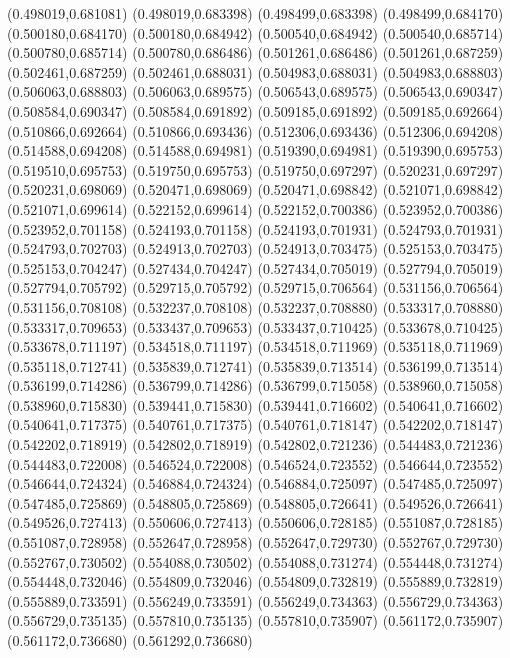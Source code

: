(0.498019,0.681081)
(0.498019,0.683398)
(0.498499,0.683398)
(0.498499,0.684170)
(0.500180,0.684170)
(0.500180,0.684942)
(0.500540,0.684942)
(0.500540,0.685714)
(0.500780,0.685714)
(0.500780,0.686486)
(0.501261,0.686486)
(0.501261,0.687259)
(0.502461,0.687259)
(0.502461,0.688031)
(0.504983,0.688031)
(0.504983,0.688803)
(0.506063,0.688803)
(0.506063,0.689575)
(0.506543,0.689575)
(0.506543,0.690347)
(0.508584,0.690347)
(0.508584,0.691892)
(0.509185,0.691892)
(0.509185,0.692664)
(0.510866,0.692664)
(0.510866,0.693436)
(0.512306,0.693436)
(0.512306,0.694208)
(0.514588,0.694208)
(0.514588,0.694981)
(0.519390,0.694981)
(0.519390,0.695753)
(0.519510,0.695753)
(0.519750,0.695753)
(0.519750,0.697297)
(0.520231,0.697297)
(0.520231,0.698069)
(0.520471,0.698069)
(0.520471,0.698842)
(0.521071,0.698842)
(0.521071,0.699614)
(0.522152,0.699614)
(0.522152,0.700386)
(0.523952,0.700386)
(0.523952,0.701158)
(0.524193,0.701158)
(0.524193,0.701931)
(0.524793,0.701931)
(0.524793,0.702703)
(0.524913,0.702703)
(0.524913,0.703475)
(0.525153,0.703475)
(0.525153,0.704247)
(0.527434,0.704247)
(0.527434,0.705019)
(0.527794,0.705019)
(0.527794,0.705792)
(0.529715,0.705792)
(0.529715,0.706564)
(0.531156,0.706564)
(0.531156,0.708108)
(0.532237,0.708108)
(0.532237,0.708880)
(0.533317,0.708880)
(0.533317,0.709653)
(0.533437,0.709653)
(0.533437,0.710425)
(0.533678,0.710425)
(0.533678,0.711197)
(0.534518,0.711197)
(0.534518,0.711969)
(0.535118,0.711969)
(0.535118,0.712741)
(0.535839,0.712741)
(0.535839,0.713514)
(0.536199,0.713514)
(0.536199,0.714286)
(0.536799,0.714286)
(0.536799,0.715058)
(0.538960,0.715058)
(0.538960,0.715830)
(0.539441,0.715830)
(0.539441,0.716602)
(0.540641,0.716602)
(0.540641,0.717375)
(0.540761,0.717375)
(0.540761,0.718147)
(0.542202,0.718147)
(0.542202,0.718919)
(0.542802,0.718919)
(0.542802,0.721236)
(0.544483,0.721236)
(0.544483,0.722008)
(0.546524,0.722008)
(0.546524,0.723552)
(0.546644,0.723552)
(0.546644,0.724324)
(0.546884,0.724324)
(0.546884,0.725097)
(0.547485,0.725097)
(0.547485,0.725869)
(0.548805,0.725869)
(0.548805,0.726641)
(0.549526,0.726641)
(0.549526,0.727413)
(0.550606,0.727413)
(0.550606,0.728185)
(0.551087,0.728185)
(0.551087,0.728958)
(0.552647,0.728958)
(0.552647,0.729730)
(0.552767,0.729730)
(0.552767,0.730502)
(0.554088,0.730502)
(0.554088,0.731274)
(0.554448,0.731274)
(0.554448,0.732046)
(0.554809,0.732046)
(0.554809,0.732819)
(0.555889,0.732819)
(0.555889,0.733591)
(0.556249,0.733591)
(0.556249,0.734363)
(0.556729,0.734363)
(0.556729,0.735135)
(0.557810,0.735135)
(0.557810,0.735907)
(0.561172,0.735907)
(0.561172,0.736680)
(0.561292,0.736680)

